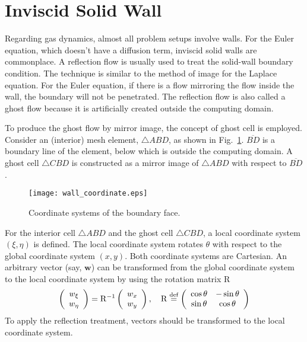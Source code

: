 \documentclass[a4paper,12pt,dvips]{article}
\newcommand*\defeq{\buildrel{\text{def}}\over{=}}
\begin{document}
\section{Inviscid Solid Wall}

Regarding gas dynamics, almost all problem setups involve walls.  For the Euler
equation, which doesn't have a diffusion term, inviscid solid walls are
commonplace.  A reflection flow is usually used to treat the solid-wall
boundary condition\cite{laney_computational_1998}.  The technique is similar to
the method of image for the Laplace equation.  For the Euler equation, if there
is a flow mirroring the flow inside the wall, the boundary will not be
penetrated.  The reflection flow is also called a ghost flow because it is
artificially created outside the computing domain.

To produce the ghost flow by mirror image, the concept of ghost cell is
employed.  Consider an (interior) mesh element, $\bigtriangleup ABD$, as shown
in Fig.~\ref{f:wall_coordinate}.  $\overline{BD}$ is a boundary line of the
element, below which is outside the computing domain.  A ghost cell
$\bigtriangleup CBD$ is constructed as a mirror image of $\bigtriangleup ABD$
with respect to $\overline{BD}$.

\begin{figure}[htbp]
\centering
\texttt{[image: wall\_coordinate.eps]}
\caption{Coordinate systems of the boundary face.}
\label{f:wall_coordinate}
\end{figure}

For the interior cell $\bigtriangleup ABD$ and the ghost cell $\bigtriangleup
CBD$, a local coordinate system $(\xi, \eta)$ is defined.  The local coordinate
system rotates $\theta$ with respect to the global coordinate system $(x, y)$.
Both coordinate systems are Cartesian.  An arbitrary vector (say, $\mathbf{w}$)
can be transformed from the global coordinate system to the local coordinate
system by using the rotation matrix $\mathrm{R}$
\begin{align*}
\left(\begin{array}{c} w_{\xi} \\ w_{\eta} \end{array}\right)
= \mathrm{R}^{-1}
\left(\begin{array}{c} w_x \\ w_y \end{array}\right), \quad
\mathrm{R} \defeq \left(\begin{array}{cc}
  \cos\theta & -\sin\theta \\ \sin\theta & \cos\theta
\end{array}\right)
\end{align*}
To apply the reflection treatment, vectors should be transformed to the local
coordinate system.
\end{document}
